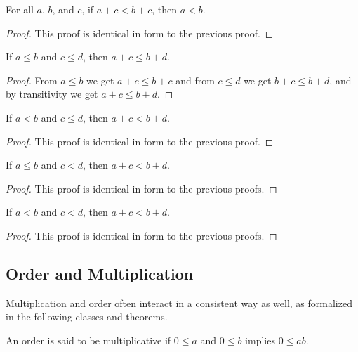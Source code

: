 \documentclass[../math.tex]{subfiles}
\begin{document}
\begin{theorem}
    For all $a$, $b$, and $c$, if $a + c < b + c$, then $a < b$.
\end{theorem}
\begin{proof}
    This proof is identical in form to the previous proof.
\end{proof}

\begin{theorem} \label{le-lrplus}
    If $a \leq b$ and $c \leq d$, then $a + c \leq b + d$.
\end{theorem}
\begin{proof}
    From $a \leq b$ we get $a + c \leq b + c$ and from $c \leq d$ we get $b + c
    \leq b + d$, and by transitivity we get $a + c \leq b + d$.
\end{proof}

\begin{theorem} \label{lt-le-lrplus}
    If $a < b$ and $c \leq d$, then $a + c < b + d$.
\end{theorem}
\begin{proof}
    This proof is identical in form to the previous proof.
\end{proof}

\begin{theorem} \label{le-lt-lrplus}
    If $a \leq b$ and $c < d$, then $a + c < b + d$.
\end{theorem}
\begin{proof}
    This proof is identical in form to the previous proofs.
\end{proof}

\begin{theorem} \label{lt-lrplus}
    If $a < b$ and $c < d$, then $a + c < b + d$.
\end{theorem}
\begin{proof}
    This proof is identical in form to the previous proofs.
\end{proof}

\subsection{Order and Multiplication}

Multiplication and order often interact in a consistent way as well, as
formalized in the following classes and theorems.

\begin{class}
    An order is said to be multiplicative if $0 \leq a$ and $0 \leq b$ implies
    $0 \leq ab$.
\end{class}
\end{document}
